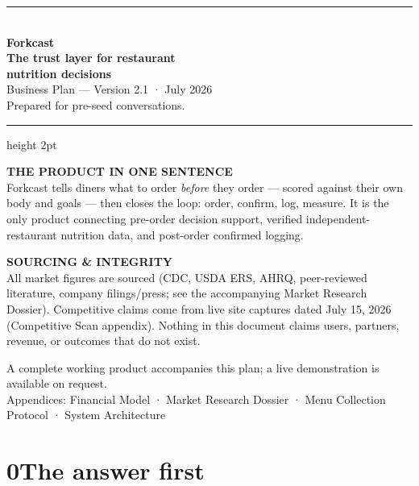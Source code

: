 \documentclass[10pt]{article}
\newcommand{\kicker}[1]{{\footnotesize\bfseries\color{accent}\MakeUppercase{#1}}}
\begin{document}
\begin{titlepage}
\thispagestyle{empty}
\vspace*{1.4cm}
{\color{accent}\rule{2.6cm}{6pt}}\\[14pt]
{\Huge\bfseries \textcolor{accent}{Fork}cast}\\[6pt]
{\LARGE\bfseries The trust layer for restaurant\\nutrition decisions}\\[16pt]
{\large\color{muted} Business Plan --- Version 2.1 · July 2026}\\[4pt]
{\small\color{muted} Prepared for pre-seed conversations.}

\vspace{1.6cm}
{\color{ground}\hrule height 2pt}
\vspace{0.9cm}

\kicker{The product in one sentence}\\[3pt]
Forkcast tells diners what to order \emph{before} they order --- scored against their own body and goals --- then closes the loop: order, confirm, log, measure. It is the only product connecting pre-order decision support, verified independent-restaurant nutrition data, and post-order confirmed logging.

\vspace{0.8cm}
\kicker{Sourcing \& integrity}\\[3pt]
All market figures are sourced (CDC, USDA ERS, AHRQ, peer-reviewed literature, company filings/press; see the accompanying Market Research Dossier). Competitive claims come from live site captures dated July 15, 2026 (Competitive Scan appendix). Nothing in this document claims users, partners, revenue, or outcomes that do not exist.

\vfill
{\small\color{muted}
A complete working product accompanies this plan; a live demonstration is available on request.\\
Appendices: Financial Model · Market Research Dossier · Menu Collection Protocol · System Architecture}
\end{titlepage}

\section*{\textcolor{accent}{0}\hspace{0.6em}The answer first}
\vspace{-6pt}{\color{accent}\rule{2.2cm}{2pt}}
\end{document}
